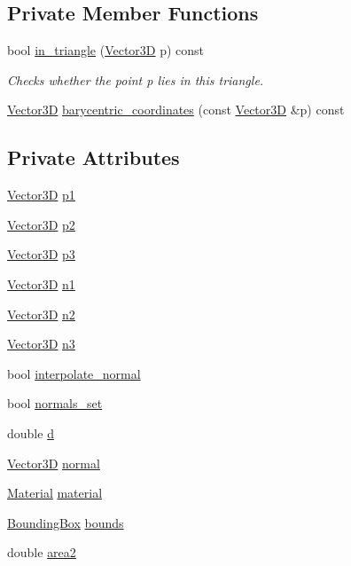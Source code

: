 \subsection*{Private Member Functions}
\begin{DoxyCompactItemize}
\item 
bool \hyperlink{classTriangle_a311884423cdebeaf2f6b6c330ae8854b}{in\+\_\+triangle} (\hyperlink{classVector3D}{Vector3D} p) const 
\begin{DoxyCompactList}\small\item\em Checks whether the point p lies in this triangle. \end{DoxyCompactList}\item 
\hyperlink{classVector3D}{Vector3D} \hyperlink{classTriangle_ad7a7c1c87e17c792fed50059f40ff65d}{barycentric\+\_\+coordinates} (const \hyperlink{classVector3D}{Vector3D} \&p) const 
\end{DoxyCompactItemize}
\subsection*{Private Attributes}
\begin{DoxyCompactItemize}
\item 
\hyperlink{classVector3D}{Vector3D} \hyperlink{classTriangle_a0461ba6ca1a0e1aa84062f93eacbe8b8}{p1}
\item 
\hyperlink{classVector3D}{Vector3D} \hyperlink{classTriangle_aa15acbc4f123f3e9e75e574566c2679a}{p2}
\item 
\hyperlink{classVector3D}{Vector3D} \hyperlink{classTriangle_a600c7366c1dad8996026742eb12434c6}{p3}
\item 
\hyperlink{classVector3D}{Vector3D} \hyperlink{classTriangle_a51a16cfc88994c78e31340029bac777f}{n1}
\item 
\hyperlink{classVector3D}{Vector3D} \hyperlink{classTriangle_ab5786d87c9f548c1e8bb5937977dd0af}{n2}
\item 
\hyperlink{classVector3D}{Vector3D} \hyperlink{classTriangle_ae91046acca032af6fb931497127f8a7e}{n3}
\item 
bool \hyperlink{classTriangle_ac0fad333557f59ba9d9cafb8c16b203a}{interpolate\+\_\+normal}
\item 
bool \hyperlink{classTriangle_a8c739e7a19f4628c9fa5e0027a32b5a9}{normals\+\_\+set}
\item 
double \hyperlink{classTriangle_a0cb5b18a8ce2cf896712cd3f9e6c80ea}{d}
\item 
\hyperlink{classVector3D}{Vector3D} \hyperlink{classTriangle_ac6e29ae9d1f7abc16cfb25357c74806f}{normal}
\item 
\hyperlink{classMaterial}{Material} \hyperlink{classTriangle_ae170999b9b35d778d9a0d084d256547b}{material}
\item 
\hyperlink{classBoundingBox}{Bounding\+Box} \hyperlink{classTriangle_ac5b18fe5f9ea12fb717e3306c300527d}{bounds}
\item 
double \hyperlink{classTriangle_a43322fb75910877dd63b17d391e3022b}{area2}
\end{DoxyCompactItemize}


